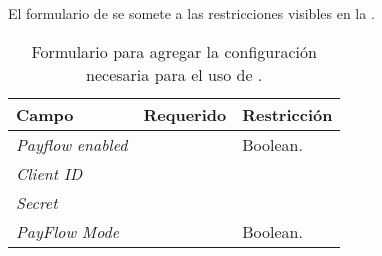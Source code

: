 			El formulario de \paypalNAME se somete a las restricciones visibles en la .

			\begin{table}[H]
			    \centering
				\begin{tabular}{ |l|c||l| }
					\hline Campo & Requerido & Restricción \\ \hline
					\multirow{1}{*}{\textit{Payflow enabled}} 	&  \checkmark 	& Boolean.\\ \hline
					\multirow{1}{*}{\textit{Client ID}} 		&  				& \\ \hline
					\multirow{1}{*}{\textit{Secret}} 			&  				& \\ \hline
					\multirow{1}{*}{\textit{PayFlow Mode}} 		&  \checkmark	& Boolean.\\ \hline
					\hline
				\end{tabular}
			 	\caption{Formulario para agregar la configuración necesaria para el uso de \paypalPayFlowNAME.}
			    \label{tab:payment:paypal:payflow_pro:form}
			\end{table}
			
